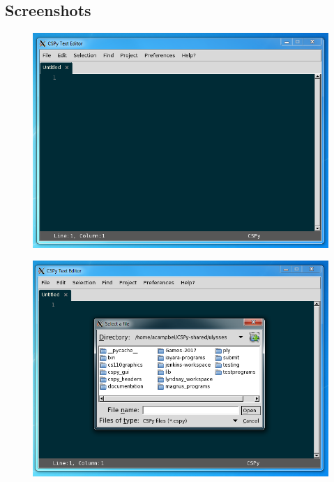 \documentclass{article}
\begin{document}
\subsection{Screenshots}
\begin{figure}[H]
\includegraphics[width=\textwidth]{CSPyTextEditorMainScreen}
\end{figure}

\begin{figure}[H]
\includegraphics[width=\textwidth]{CSPyTextEditorOpenFile}
\end{figure}
\end{document}

